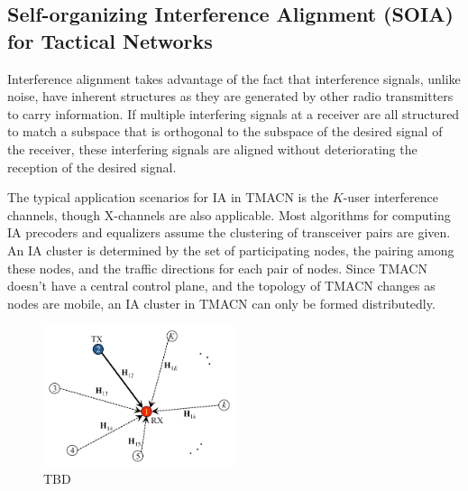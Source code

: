 \documentclass[letterpaper,11pt,onecolumn]{article}
\begin{document}


\subsection{Self-organizing Interference Alignment (SOIA) for Tactical Networks}

Interference alignment takes advantage of the fact that interference signals, unlike noise, have inherent structures as they are generated by other radio transmitters to carry information. If multiple interfering signals at a receiver are all structured to match a subspace that is orthogonal to the subspace of the desired signal of the receiver, these interfering signals are aligned without deteriorating the reception of the desired signal. 

The typical application scenarios for IA in TMACN is the $K$-user interference channels, though X-channels are also applicable. Most algorithms for computing IA precoders and equalizers assume the clustering of transceiver pairs are given. An IA cluster is determined by the set of participating nodes,  the pairing among these nodes, and the traffic directions for each pair of nodes. Since TMACN doesn't have a central control plane, and the topology of TMACN changes as nodes are mobile, an IA cluster in TMACN can only be formed distributedly.



\begin{figure}[h]
\begin{center}
\includegraphics[width=0.5\textwidth]{../figures/InterferenceAlignment_1.png}
\caption{TBD}
\label{fig:IA_SingleRx}
\end{center}
\end{figure}
\end{document}
